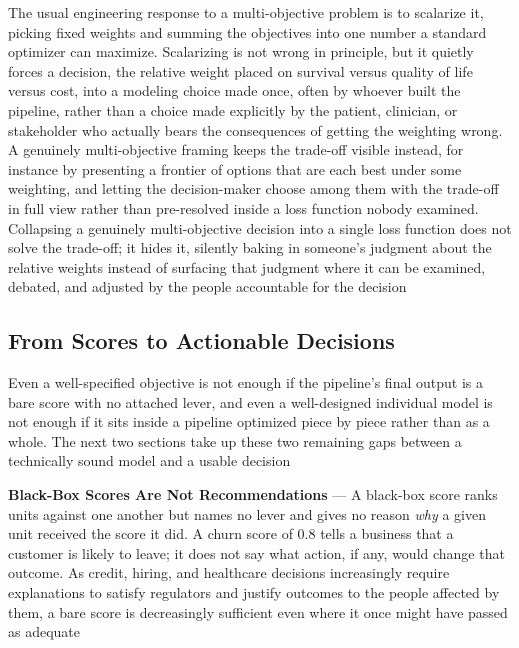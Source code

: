 The usual engineering response to a multi-objective problem is to scalarize it,
picking fixed weights and summing the objectives into one number a standard
optimizer can maximize. Scalarizing is not wrong in principle, but it quietly
forces a decision, the relative weight placed on survival versus quality of life
versus cost, into a modeling choice made once, often by whoever built the pipeline,
rather than a choice made explicitly by the patient, clinician, or stakeholder
who actually bears the consequences of getting the weighting wrong. A genuinely multi-objective
framing keeps the trade-off visible instead, for instance by presenting a
frontier of options that are each best under some weighting, and letting the decision-maker
choose among them with the trade-off in full view rather than pre-resolved inside
a loss function nobody examined. Collapsing a genuinely multi-objective decision
into a single loss function does not solve the trade-off; it hides it, silently
baking in someone's judgment about the relative weights instead of surfacing
that judgment where it can be examined, debated, and adjusted by the people
accountable for the decision

\subsection{From Scores to Actionable Decisions}
\label{sec:scores-to-actionable-decisions}

Even a well-specified objective is not enough if the pipeline's final output is
a bare score with no attached lever, and even a well-designed individual model is
not enough if it sits inside a pipeline optimized piece by piece rather than as a
whole. The next two sections take up these two remaining gaps between a
technically sound model and a usable decision

\textbf{Black-Box Scores Are Not Recommendations} --- A black-box score ranks
units against one another but names no lever and gives no reason \emph{why} a given
unit received the score it did. A churn score of 0.8 tells a business that a
customer is likely to leave; it does not say what action, if any, would change that
outcome. As credit, hiring, and healthcare decisions increasingly require
explanations to satisfy regulators and justify outcomes to the people affected
by them, a bare score is decreasingly sufficient even where it once might have passed
as adequate

